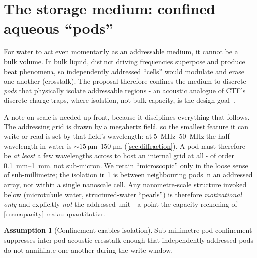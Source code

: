 \documentclass[11pt]{article}
\theoremstyle{definition}
\newtheorem{assumption}{Assumption}
\begin{document}
\section{The storage medium: confined aqueous ``pods''}
\label{sec:medium}

For water to act even momentarily as an addressable medium, it cannot be a bulk volume.
In bulk liquid, distinct driving frequencies superpose and produce beat phenomena, so
independently addressed ``cells'' would modulate and erase one another (crosstalk). The
proposal therefore confines the medium to discrete \emph{pods} that physically isolate
addressable regions - an acoustic analogue of CTF's discrete charge traps, where isolation,
not bulk capacity, is the design goal~\cite{white2000sonos}.

A note on scale is needed up front, because it disciplines everything that follows. The
addressing grid is drawn by a megahertz field, so the smallest feature it can write or read
is set by that field's wavelength: at \qtyrange{5}{50}{\mega\hertz} the half-wavelength in
water is ${\sim}\qtyrange{15}{150}{\micro\meter}$ (\cref{sec:diffraction}). A pod must
therefore be \emph{at least} a few wavelengths across to host an internal grid at all - of
order \qtyrange{0.1}{1}{\milli\meter}, not sub-micron. We retain ``microscopic'' only in the
loose sense of sub-millimetre; the isolation in \cref{as:confine} is between neighbouring
pods in an addressed array, not within a single nanoscale cell. Any nanometre-scale
structure invoked below (microtubule water, structured-water ``pearls'') is therefore
\emph{motivational only} and explicitly \emph{not} the addressed unit - a point the capacity
reckoning of \cref{sec:capacity} makes quantitative.

\begin{assumption}[Confinement enables isolation]\label{as:confine}
Sub-millimetre pod confinement suppresses inter-pod acoustic crosstalk enough that
independently addressed pods do not annihilate one another during the write window.
\end{assumption}
\end{document}

